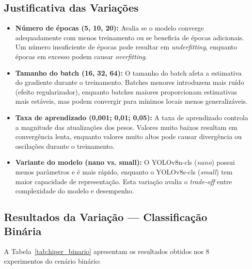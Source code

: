 \documentclass[12pt, a4paper]{article}
\begin{document}
\subsection{Justificativa das Variações}

\begin{itemize}
    \item \textbf{Número de épocas (5, 10, 20):} Avalia se o modelo converge adequadamente com menos treinamento ou se beneficia de épocas adicionais. Um número insuficiente de épocas pode resultar em \textit{underfitting}, enquanto épocas em excesso podem causar \textit{overfitting}.

    \item \textbf{Tamanho do batch (16, 32, 64):} O tamanho do batch afeta a estimativa do gradiente durante o treinamento. Batches menores introduzem mais ruído (efeito regularizador), enquanto batches maiores proporcionam estimativas mais estáveis, mas podem convergir para mínimos locais menos generalizáveis.

    \item \textbf{Taxa de aprendizado (0,001; 0,01; 0,05):} A taxa de aprendizado controla a magnitude das atualizações dos pesos. Valores muito baixos resultam em convergência lenta, enquanto valores muito altos pode causar divergência ou oscilações durante o treinamento.

    \item \textbf{Variante do modelo (nano vs. small):} O YOLOv8n-cls (\textit{nano}) possui menos parâmetros e é mais rápido, enquanto o YOLOv8s-cls (\textit{small}) tem maior capacidade de representação. Esta variação avalia o \textit{trade-off} entre complexidade do modelo e desempenho.
\end{itemize}

\subsection{Resultados da Variação --- Classificação Binária}

A Tabela~\ref{tab:hiper_binario} apresentam os resultados obtidos nos 8 experimentos do cenário binário:
\end{document}
